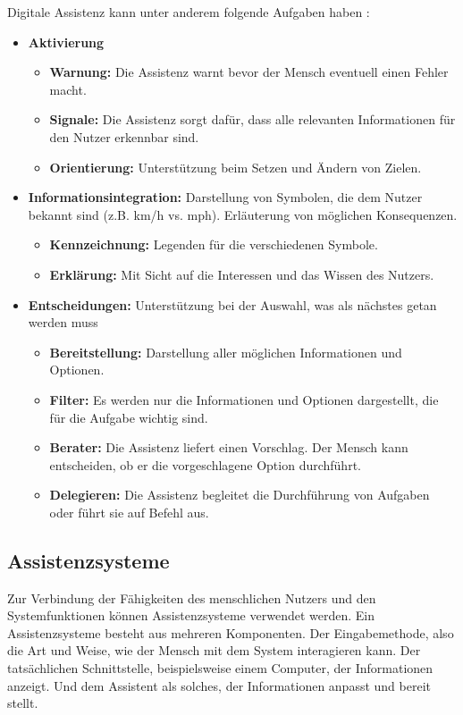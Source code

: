 Digitale Assistenz kann unter anderem folgende Aufgaben haben \cite{Wandke2005}:
\begin{itemize}
\item \textbf{Aktivierung}
	\begin{itemize}
	\item \textbf{Warnung:} Die Assistenz warnt bevor der Mensch eventuell einen Fehler macht.
	\item \textbf{Signale:} Die Assistenz sorgt dafür, dass alle relevanten Informationen für den Nutzer erkennbar sind.
	\item \textbf{Orientierung:} Unterstützung beim Setzen und Ändern von Zielen.
	\end{itemize}
\item \textbf{Informationsintegration:} Darstellung von Symbolen, die dem Nutzer bekannt sind (z.B. km/h vs. mph). Erläuterung von möglichen Konsequenzen.
	\begin{itemize}
	\item \textbf{Kennzeichnung:} Legenden für die verschiedenen Symbole.
	\item \textbf{Erklärung:} Mit Sicht auf die Interessen und das Wissen des Nutzers.
	\end{itemize}
\item \textbf{Entscheidungen:} Unterstützung bei der Auswahl, was als nächstes getan werden muss
	\begin{itemize}
	\item \textbf{Bereitstellung:} Darstellung aller möglichen Informationen und Optionen.
	\item \textbf{Filter:} Es werden nur die Informationen und Optionen dargestellt, die für die Aufgabe wichtig sind.
	\item \textbf{Berater:} Die Assistenz liefert einen Vorschlag. Der Mensch kann entscheiden, ob er die vorgeschlagene Option durchführt.
	\item \textbf{Delegieren:} Die Assistenz begleitet die Durchführung von Aufgaben oder führt sie auf Befehl aus.
	\end{itemize}
\end{itemize}

\subsection{Assistenzsysteme}
\label{2:Assistenzsysteme}
Zur Verbindung der Fähigkeiten des menschlichen Nutzers und den Systemfunktionen können Assistenzsysteme verwendet werden. Ein Assistenzsysteme besteht aus mehreren Komponenten. Der Eingabemethode, also die Art und Weise, wie der Mensch mit dem System interagieren kann. Der tatsächlichen Schnittstelle, beispielsweise einem Computer, der Informationen anzeigt. Und dem Assistent als solches, der Informationen anpasst und bereit stellt.

